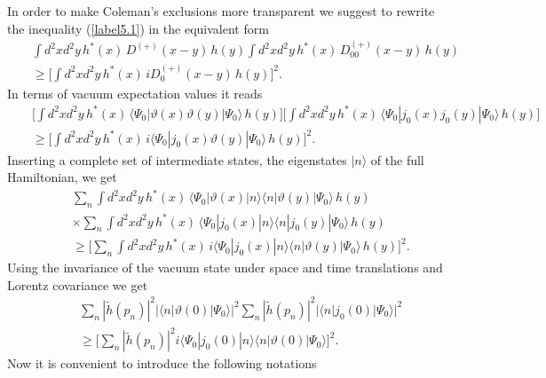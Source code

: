\documentclass[a4paper,12pt] {article}
\begin{document}
In order to make Coleman's exclusions more transparent we suggest to
rewrite the inequality (\ref{label5.1}) in the equivalent form
%
\begin{eqnarray}\label{label5.4}
&&\int d^2xd^2y\,h^*(x)\,D^{(+)}(x-y)\,h(y)\int
d^2xd^2y\,h^*(x)\,D^{(+)}_{00}(x-y)\,h(y)\nonumber\\ && \ge \Big[\int
d^2xd^2y\,h^*(x)\,iD^{(+)}_0(x-y)\,h(y)\Big]^2.
\end{eqnarray}
%
In terms of vacuum expectation values it reads
%
\begin{eqnarray}\label{label5.5}
&&\Big[\int d^2xd^2y\,h^*(x)\,\langle
\Psi_0|\vartheta(x)\vartheta(y)|\Psi_0\rangle\,h(y)\Big]\Big[\int
d^2xd^2y\,h^*(x)\,\langle
\Psi_0|j_0(x)j_0(y)|\Psi_0\rangle\,h(y)\Big]\nonumber\\ && \ge
\Big[\int d^2xd^2y\,h^*(x)\,i\langle
\Psi_0|j_0(x)\vartheta(y)|\Psi_0\rangle\,h(y)\Big]^2.
\end{eqnarray}
%
Inserting a complete set of intermediate states, the eigenstates
$|n\rangle$ of the full Hamiltonian, we get
%
\begin{eqnarray}\label{label5.6}
&&\sum_n\int d^2xd^2y\,h^*(x)\,\langle
\Psi_0|\vartheta(x)|n\rangle\langle
n|\vartheta(y)|\Psi_0\rangle\,h(y)\nonumber\\ &&\times\sum_n\int
d^2xd^2y\,h^*(x)\,\langle \Psi_0|j_0(x)|n\rangle\langle
n|j_0(y)|\Psi_0\rangle\,h(y)\nonumber\\ && \ge \Big[\sum_n\int
d^2xd^2y\,h^*(x)\,i\langle \Psi_0|j_0(x)|n\rangle\langle
n|\vartheta(y)|\Psi_0\rangle\,h(y)\Big]^2.
\end{eqnarray}
%
Using the invariance of the vacuum state under space and time
translations and Lorentz covariance we get
%
\begin{eqnarray}\label{label5.7}
&&\sum_n |\tilde{h}(p_n)|^2 |\langle
n|\vartheta(0)|\Psi_0\rangle|^2\sum_n|\tilde{h}(p_n)|^2|\langle
n|j_0(0)|\Psi_0\rangle|^2\nonumber\\ && \ge \Big[\sum_n
|\tilde{h}(p_n)|^2i\langle \Psi_0|j_0(0)|n\rangle\langle
n|\vartheta(0)|\Psi_0\rangle\Big]^2.
\end{eqnarray}
%
Now it is convenient to introduce the following notations
%
\end{document}
